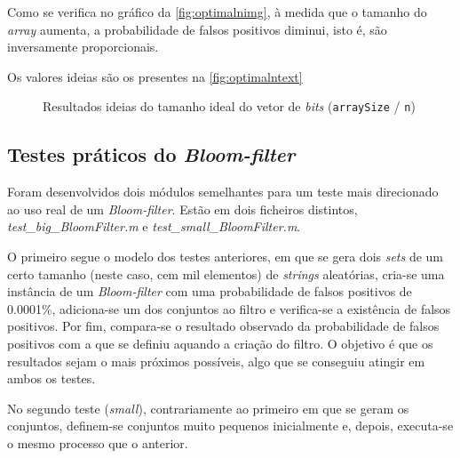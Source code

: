 \documentclass[a4paper,11pt,openright,oneside]{report}
\begin{document}
Como se verifica no gráfico da \autoref{fig:optimalnimg}, à medida que o tamanho do \textit{array} aumenta, a probabilidade de falsos positivos diminui, isto é, são inversamente proporcionais.

Os valores ideias são os presentes na \autoref{fig:optimalntext}

\begin{figure}[ht]	
\center
{}
\caption{Resultados ideias do tamanho ideal do vetor de \textit{bits} (\texttt{arraySize} / \texttt{n})}
\label{fig:optimalntext}
\end{figure}

\subsection{Testes práticos do \textit{Bloom-filter}}
\label{subsec.testebloom}

Foram desenvolvidos dois módulos semelhantes para um teste mais direcionado ao uso real de um \textit{Bloom-filter}. Estão em dois ficheiros distintos, \textit{test\_big\_BloomFilter.m} e \textit{test\_small\_BloomFilter.m}.

O primeiro segue o modelo dos testes anteriores, em que se gera dois \textit{sets} de um certo tamanho (neste caso, cem mil elementos) de \textit{strings} aleatórias, cria-se uma instância de um \textit{Bloom-filter} com uma probabilidade de falsos positivos de 0.0001\%, adiciona-se um dos conjuntos ao filtro e verifica-se a existência de falsos positivos. Por fim, compara-se o resultado observado da probabilidade de falsos positivos com a que se definiu aquando a criação do filtro. O objetivo é que os resultados sejam o mais próximos possíveis, algo que se conseguiu atingir em ambos os testes.

No segundo teste (\textit{small}), contrariamente ao primeiro em que se geram os conjuntos, definem-se conjuntos muito pequenos inicialmente e, depois, executa-se o mesmo processo que o anterior.
\end{document}
